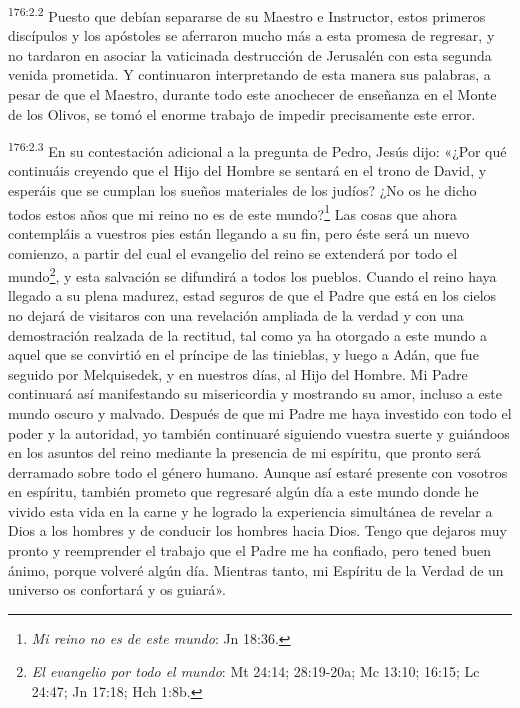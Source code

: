 \par 
\textsuperscript{176:2.2} Puesto que debían separarse de su Maestro e Instructor, estos primeros discípulos y los apóstoles se aferraron mucho más a esta promesa de regresar, y no tardaron en asociar la vaticinada destrucción de Jerusalén con esta segunda venida prometida. Y continuaron interpretando de esta manera sus palabras, a pesar de que el Maestro, durante todo este anochecer de enseñanza en el Monte de los Olivos, se tomó el enorme trabajo de impedir precisamente este error.

\par 
\textsuperscript{176:2.3} En su contestación adicional a la pregunta de Pedro, Jesús dijo: «¿Por qué continuáis creyendo que el Hijo del Hombre se sentará en el trono de David, y esperáis que se cumplan los sueños materiales de los judíos? ¿No os he dicho todos estos años que mi reino no es de este mundo?\footnote{\textit{Mi reino no es de este mundo}: Jn 18:36.} Las cosas que ahora contempláis a vuestros pies están llegando a su fin, pero éste será un nuevo comienzo, a partir del cual el evangelio del reino se extenderá por todo el mundo\footnote{\textit{El evangelio por todo el mundo}: Mt 24:14; 28:19-20a; Mc 13:10; 16:15; Lc 24:47; Jn 17:18; Hch 1:8b.}, y esta salvación se difundirá a todos los pueblos. Cuando el reino haya llegado a su plena madurez, estad seguros de que el Padre que está en los cielos no dejará de visitaros con una revelación ampliada de la verdad y con una demostración realzada de la rectitud, tal como ya ha otorgado a este mundo a aquel que se convirtió en el príncipe de las tinieblas, y luego a Adán, que fue seguido por Melquisedek, y en nuestros días, al Hijo del Hombre. Mi Padre continuará así manifestando su misericordia y mostrando su amor, incluso a este mundo oscuro y malvado. Después de que mi Padre me haya investido con todo el poder y la autoridad, yo también continuaré siguiendo vuestra suerte y guiándoos en los asuntos del reino mediante la presencia de mi espíritu, que pronto será derramado sobre todo el género humano. Aunque así estaré presente con vosotros en espíritu, también prometo que regresaré algún día a este mundo donde he vivido esta vida en la carne y he logrado la experiencia simultánea de revelar a Dios a los hombres y de conducir los hombres hacia Dios. Tengo que dejaros muy pronto y reemprender el trabajo que el Padre me ha confiado, pero tened buen ánimo, porque volveré algún día. Mientras tanto, mi Espíritu de la Verdad de un universo os confortará y os guiará».

